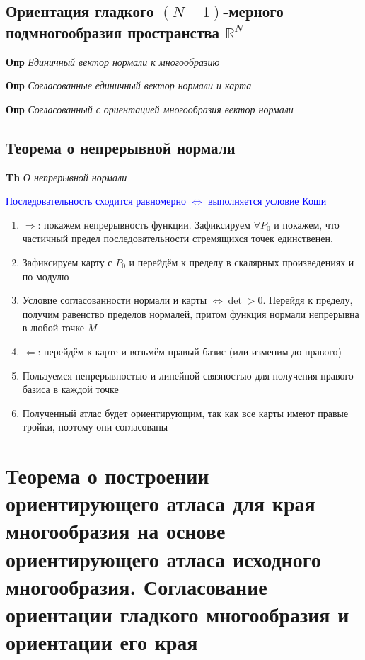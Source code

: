 \documentclass[a4paper, 14pt]{article}
\begin{document}
    \subsection{Ориентация гладкого $(N - 1)$-мерного подмногообразия пространства $\mathbb{R}^N$}
    
    \textbf{Опр} \textit{Единичный вектор нормали к многообразию}
    
    \textbf{Опр} \textit{Согласованные единичный вектор нормали и карта}
    
    \textbf{Опр} \textit{Согласованный с ориентацией многообразия вектор нормали}
    
    \subsection{Теорема о непрерывной нормали}
    
    \textbf{Th} \textit{О непрерывной нормали}
    
    \textcolor{blue}{Последовательность сходится равномерно $\Leftrightarrow$ выполняется условие Коши}
    
    \begin{enumerate}
        \item $\Rightarrow$: покажем непрерывность функции.
        Зафиксируем $\forall P_0$ и покажем, что частичный предел последовательности стремящихся точек единственен.
        \item Зафиксируем карту с $P_0$ и перейдём к пределу в скалярных произведениях и по модулю
        \item Условие согласованности нормали и карты $\Leftrightarrow \det > 0$.
        Перейдя к пределу, получим равенство пределов нормалей, притом функция нормали непрерывна в любой точке $M$
        \item $\Leftarrow$: перейдём к карте и возьмём правый базис (или изменим до правого)
        \item Пользуемся непрерывностью и линейной связностью для получения правого базиса в каждой точке
        \item Полученный атлас будет ориентирующим, так как все карты имеют правые тройки, поэтому они согласованы
    \end{enumerate}
    
    \section{Теорема о построении ориентирующего атласа для края многообразия на основе ориентирующего атласа
    исходного многообразия.
    Согласование ориентации гладкого многообразия и ориентации его края}
    
\end{document}

